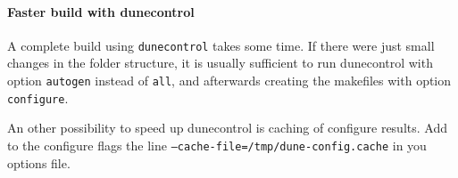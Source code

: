 \paragraph{Faster build with dunecontrol}
A complete build using \texttt{dunecontrol} takes some time. If there were just small changes in the folder structure, it is usually sufficient to run dunecontrol with option \texttt{autogen} instead of \texttt{all}, and afterwards creating the makefiles with option \texttt{configure}.

An other possibility to speed up dunecontrol is caching of configure results. Add to the configure flags the line \texttt{--cache-file=/tmp/dune-config.cache} in you options file.

